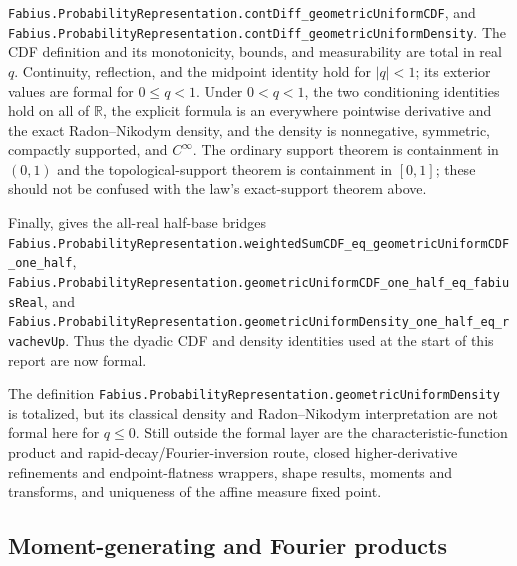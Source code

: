 \documentclass[11pt,oneside]{article}
\theoremstyle{definition}
\theoremstyle{remark}
\newcommand{\R}{\mathbb R}
\newcommand{\1}{\mathbf 1}
\begin{document}
\begin{statusbox}
\nolinkurl{Fabius.ProbabilityRepresentation.contDiff_geometricUniformCDF}, and
\nolinkurl{Fabius.ProbabilityRepresentation.contDiff_geometricUniformDensity}.
The CDF definition and its monotonicity, bounds, and measurability are total in real \(q\).
Continuity, reflection, and the midpoint identity hold for \(|q|<1\); its exterior values
are formal for \(0\le q<1\).  Under \(0<q<1\), the two conditioning identities hold on
all of \(\R\), the explicit formula is an everywhere pointwise derivative and the exact
Radon--Nikodym density, and the density is nonnegative, symmetric, compactly supported,
and \(C^\infty\).  The ordinary support theorem is containment in \((0,1)\) and the
topological-support theorem is containment in \([0,1]\); these should not be confused with
the law's exact-support theorem above.

Finally,  gives the all-real half-base bridges
\nolinkurl{Fabius.ProbabilityRepresentation.weightedSumCDF_eq_geometricUniformCDF_one_half},
\nolinkurl{Fabius.ProbabilityRepresentation.geometricUniformCDF_one_half_eq_fabiusReal},
and
\nolinkurl{Fabius.ProbabilityRepresentation.geometricUniformDensity_one_half_eq_rvachevUp}.
Thus the dyadic CDF and density identities used at the start of this report are now formal.

The definition \nolinkurl{Fabius.ProbabilityRepresentation.geometricUniformDensity} is
totalized, but its classical density and Radon--Nikodym interpretation are not formal here for
\(q\le0\).  Still outside the formal layer are the characteristic-function product and
rapid-decay/Fourier-inversion route, closed higher-derivative refinements and endpoint-flatness
wrappers, shape results, moments and transforms, and uniqueness of the affine measure fixed
point.
\end{statusbox}

\subsection{Moment-generating and Fourier products}
\end{document}
